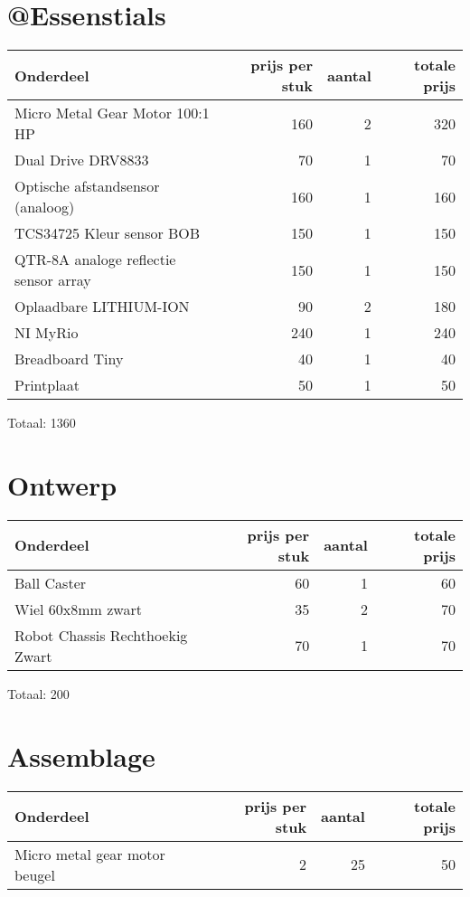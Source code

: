 \documentclass[12pt]{article}
\begin{document}
	\section*{@Essenstials}
	
	\begin{tabular}{l|r|r|r}
		Onderdeel& prijs per stuk & aantal & totale prijs \\
		\hline
		Micro Metal Gear Motor 100:1 HP&160 & 2 & 320 \\ 
		  
		Dual Drive DRV8833 & 70 & 1 & 70 \\
		Optische afstandsensor (analoog) & 160 & 1 & 160 \\
		TCS34725 Kleur sensor BOB & 150 & 1 & 150 \\
		QTR-8A analoge reflectie sensor array & 150 & 1 & 150 \\
		Oplaadbare LITHIUM-ION & 90 & 2 & 180 \\
		NI MyRio  & 240 & 1 & 240 \\
		Breadboard Tiny & 40 & 1 & 40 \\
		Printplaat & 50 & 1 & 50 \\
		
	\end{tabular}

	Totaal: 1360

	\section*{Ontwerp}
	
	\begin{tabular}{l|r|r|r}
		Onderdeel& prijs per stuk & aantal & totale prijs \\
		\hline
		Ball Caster &60 & 1 & 60 \\
		Wiel 60x8mm zwart &35 & 2 & 70 \\
		Robot Chassis Rechthoekig Zwart &70 & 1 & 70 \\
	\end{tabular}
\newline
	Totaal: 200
	


	\section*{Assemblage}
	
	\begin{tabular}{l|r|r|r}
		Onderdeel& prijs per stuk & aantal & totale prijs \\
		\hline
		Micro metal gear motor beugel &2 & 25 & 50 \\
		
	\end{tabular}
\end{document}
